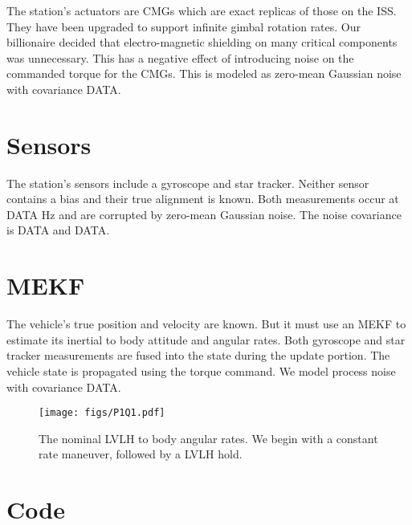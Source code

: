 \documentclass[]{article}
\begin{document}
The station's actuators are CMGs which are exact replicas of those on the ISS. They have been upgraded to support infinite gimbal rotation rates. Our billionaire decided that electro-magnetic shielding on many critical components was unnecessary. This has a negative effect of introducing noise on the commanded torque for the CMGs. This is modeled as zero-mean Gaussian noise with covariance DATA.

\section{Sensors}

The station's sensors include a gyroscope and star tracker. Neither sensor contains a bias and their true alignment is known. Both measurements occur at DATA Hz and are corrupted by zero-mean Gaussian noise. The noise covariance is DATA and DATA. 

\section{MEKF}

The vehicle's true position and velocity are known. But it must use an MEKF to estimate its inertial to body attitude and angular rates. Both gyroscope and star tracker measurements are fused into the state during the update portion. The vehicle state is propagated using the torque command. We model process noise with covariance DATA.

\begin{figure}[!h]
	\centering
	\texttt{[image: figs/P1Q1.pdf]}
	\caption{The nominal LVLH to body angular rates. We begin with a constant rate maneuver, followed by a LVLH hold.}
	\label{fig:P1Q1}
\end{figure}


\section{Code}

%
%
\end{document}
